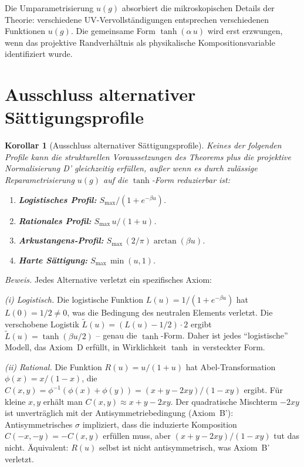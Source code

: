 \documentclass[aps,prd,twocolumn,superscriptaddress,nofootinbib]{revtex4-2}
\newtheorem{corollary}{Korollar}
\begin{document}
Die Umparametrisierung $u(g)$ absorbiert die mikroskopischen Details der Theorie: verschiedene UV-Vervollständigungen entsprechen verschiedenen Funktionen $u(g)$. Die gemeinsame Form $\tanh(\alpha\,u)$ wird erst erzwungen, wenn das projektive Randverhältnis als physikalische Kompositionsvariable identifiziert wurde.



\section{Ausschluss alternativer Sättigungsprofile}
\label{sec:exclusion}

\begin{corollary}[Ausschluss alternativer Sättigungsprofile]
\label{cor:exclusion}
Keines der folgenden Profile kann die strukturellen Voraussetzungen des Theorems plus die projektive Normalisierung D' gleichzeitig erfüllen, außer wenn es durch zulässige Reparametrisierung $u(g)$ auf die $\tanh$-Form reduzierbar ist:
\begin{enumerate}
\item[(i)] \textbf{Logistisches Profil:} $S_{\max}/(1 + e^{-\beta u})$.
\item[(ii)] \textbf{Rationales Profil:} $S_{\max}\,u/(1 + u)$.
\item[(iii)] \textbf{Arkustangens-Profil:} $S_{\max}\,(2/\pi)\arctan(\beta u)$.
\item[(iv)] \textbf{Harte Sättigung:} $S_{\max}\,\min(u, 1)$.
\end{enumerate}
\end{corollary}

\textit{Beweis.} Jedes Alternative verletzt ein spezifisches Axiom:

\textit{(i) Logistisch.} Die logistische Funktion $L(u) = 1/(1 + e^{-\beta u})$ hat $L(0) = 1/2 \neq 0$, was die Bedingung des neutralen Elements verletzt. Die verschobene Logistik $\tilde{L}(u) = (L(u) - 1/2) \cdot 2$ ergibt $\tilde{L}(u) = \tanh(\beta u/2)$ -- genau die $\tanh$-Form. Daher ist jedes ``logistische'' Modell, das Axiom~D erfüllt, in Wirklichkeit $\tanh$ in versteckter Form.

\textit{(ii) Rational.} Die Funktion $R(u) = u/(1+u)$ hat Abel-Transformation $\phi(x) = x/(1-x)$, die $C(x,y) = \phi^{-1}(\phi(x) + \phi(y)) = (x + y - 2xy)/(1 - xy)$ ergibt. Für kleine $x, y$ erhält man $C(x,y) \approx x + y - 2xy$. Der quadratische Mischterm $-2xy$ ist unverträglich mit der Antisymmetriebedingung (Axiom~B'): Antisymmetrisches $\sigma$ impliziert, dass die induzierte Komposition $C(-x,-y) = -C(x,y)$ erfüllen muss, aber $(x+y-2xy)/(1-xy)$ tut das nicht. Äquivalent: $R(u)$ selbst ist nicht antisymmetrisch, was Axiom~B' verletzt.
\end{document}
